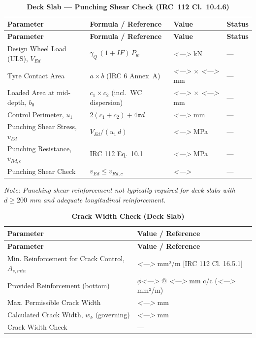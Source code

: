 \documentclass[12pt,a4paper]{report}
\numberwithin{table}{chapter}
\numberwithin{figure}{chapter}
\newcommand{\placeholder}[1]{\textit{\textless #1\textgreater}}
\begin{document}
\vspace{1em}
\begin{longtable}{|L{5.5cm}|C{3.5cm}|>{\centering\arraybackslash}p{4.5cm}|C{2cm}|}
\caption{\textbf{Deck Slab --- Punching Shear Check (IRC~112 Cl.~10.4.6)}}
\hline
{} \textbf{Parameter} & \textbf{Formula / Reference} & \textbf{Value} & \textbf{Status} \\[6pt]
\hline
\endfirsthead
\hline
{} \textbf{Parameter} & \textbf{Formula / Reference} & \textbf{Value} & \textbf{Status} \\[6pt]
\hline
\endhead
Design Wheel Load (ULS), $V_{Ed}$ & $\gamma_Q\,(1+IF)\,P_w$ & \placeholder{---} kN & --- \\[6pt]
\hline
Tyre Contact Area & $a \times b$ (IRC 6 Annex~A) & \placeholder{---} $\times$ \placeholder{---} mm & --- \\[6pt]
\hline
Loaded Area at mid-depth, $b_0$ & $c_1 \times c_2$ (incl.\ WC dispersion) & \placeholder{---} $\times$ \placeholder{---} mm & --- \\[6pt]
\hline
Control Perimeter, $u_1$ & $2(c_1+c_2) + 4\pi d$ & \placeholder{---} mm & --- \\[6pt]
\hline
Punching Shear Stress, $v_{Ed}$ & $V_{Ed} / (u_1\,d)$ & \placeholder{---} MPa & --- \\[6pt]
\hline
Punching Resistance, $v_{Rd,c}$ & IRC 112 Eq.\ 10.1 & \placeholder{---} MPa & --- \\[6pt]
\hline
Punching Shear Check & $v_{Ed} \leq v_{Rd,c}$ & \placeholder{---} & --- \\[6pt]
\hline
\end{longtable}
\noindent\textit{Note: Punching shear reinforcement not typically required for deck slabs with $d \geq 200$ mm and adequate longitudinal reinforcement.}

\vspace{1em}
\clearpage
\begin{longtable}{|L{7cm}|>{\arraybackslash}p{8.5cm}|}
\caption{\textbf{Crack Width Check (Deck Slab)}}
\hline
{} \textbf{Parameter} & \textbf{Value / Reference} \\[6pt]
\hline
\endfirsthead
\hline
{} \textbf{Parameter} & \textbf{Value / Reference} \\[6pt]
\hline
\endhead
\textnormal{Min. Reinforcement for Crack Control, $A_{s,min}$} & \placeholder{---} mm²/m [IRC 112 Cl. 16.5.1] \\[6pt]
\hline
\textnormal{Provided Reinforcement (bottom)} & $\phi$\placeholder{---} @ \placeholder{---} mm c/c (\placeholder{---} mm²/m) \\[6pt]
\hline
\textnormal{Max. Permissible Crack Width} & \placeholder{---} mm \\[6pt]
\hline
\textnormal{Calculated Crack Width, $w_k$ (governing)} & \placeholder{---} mm \\[6pt]
\hline
\textnormal{Crack Width Check} & --- \\[6pt]
\hline
\end{longtable}
\end{document}

